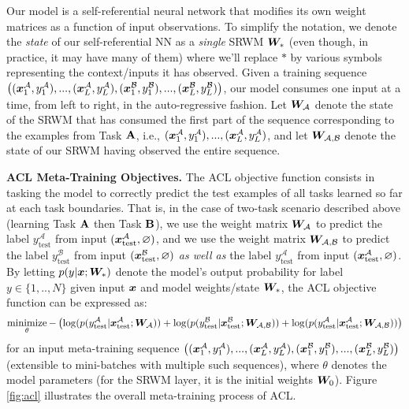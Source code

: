 \documentclass{article}
\begin{document}
Our model is a self-referential neural network that modifies its own weight matrices as a function of input observations.
To simplify the notation, we denote the \textit{state} of our self-referential NN as a \textit{single} SRWM ${\bm{W}}_*$ (even though, in practice, it may have many of them) where we'll replace $*$ by various symbols representing the context/inputs it has observed.
Given a training sequence $\left(({\bm{x}}^{\mathcal{A}}_1, y^{\mathcal{A}}_1), ..., ({\bm{x}}^{\mathcal{A}}_L, y^{\mathcal{A}}_L), ({\bm{x}}^{\mathcal{B}}_1, y^{\mathcal{B}}_1), ..., ({\bm{x}}^{\mathcal{B}}_L, y^{\mathcal{B}}_L)\right)$,
our model consumes one input at a time, from left to right, in the auto-regressive fashion.
Let ${\bm{W}}_{\mathcal{A}}$ denote the state of the SRWM that has consumed the first part of the sequence corresponding to the examples from Task ${\mathbf{A}}$, i.e., $({\bm{x}}^{\mathcal{A}}_1, y^{\mathcal{A}}_1), ..., ({\bm{x}}^{\mathcal{A}}_L, y^{\mathcal{A}}_L)$, and let ${\bm{W}}_{\mathcal{A}, \mathcal{B}}$ denote the state of our SRWM having observed the entire sequence.

\textbf{ACL Meta-Training Objectives.} The ACL objective function consists in tasking the model to correctly predict the test examples of all tasks learned so far at each task boundaries.
That is, in the case of two-task scenario described above (learning Task ${\mathbf{A}}$ then Task ${\mathbf{B}}$), we use the weight matrix ${\bm{W}}_{\mathcal{A}}$ to predict the label $y^{\mathcal{A}}_\text{test}$ from input $({\bm{x}}^{\mathcal{A}}_\text{test}, \varnothing)$, and we use the weight matrix ${\bm{W}}_{\mathcal{A}, \mathcal{B}}$ to predict the label $y^{\mathcal{B}}_\text{test}$ from input $({\bm{x}}^{\mathcal{B}}_\text{test}, \varnothing)$ \textit{as well as} the label $y^{\mathcal{A}}_\text{test}$ from input $({\bm{x}}^{\mathcal{A}}_\text{test}, \varnothing)$.
By letting $p(y|{\bm{x}}; {\bm{W}}_{*})$ denote the model's output probability for label $y \in \{1,.., N\}$ given input ${\bm{x}}$ and model weights/state ${\bm{W}}_{*}$, the ACL objective function can be expressed as:
\begin{align}
\mathop\text{minimize}_{\theta} -\left(\log(p(y^{\mathcal{A}}_\text{test}|{\bm{x}}^{\mathcal{A}}_\text{test}; {\bm{W}}_{\mathcal{A}})) + \log(p(y^{\mathcal{B}}_\text{test}|{\bm{x}}^{\mathcal{B}}_\text{test}; {\bm{W}}_{\mathcal{A, B}})) + \log(p(y^{\mathcal{A}}_\text{test}|{\bm{x}}^{\mathcal{A}}_\text{test}; {\bm{W}}_{\mathcal{A, B}})) \right)
\label{eq:acl_loss}
\end{align}
for an input meta-training sequence $\left(({\bm{x}}^{\mathcal{A}}_1, y^{\mathcal{A}}_1), ..., ({\bm{x}}^{\mathcal{A}}_L, y^{\mathcal{A}}_L), ({\bm{x}}^{\mathcal{B}}_1, y^{\mathcal{B}}_1), ..., ({\bm{x}}^{\mathcal{B}}_L, y^{\mathcal{B}}_L)\right)$
(extensible to mini-batches with multiple such sequences), where $\theta$ denotes the model parameters (for the SRWM layer, it is the initial weights ${\bm{W}}_0$).
Figure \ref{fig:acl} illustrates the overall meta-training process of ACL.
\end{document}
